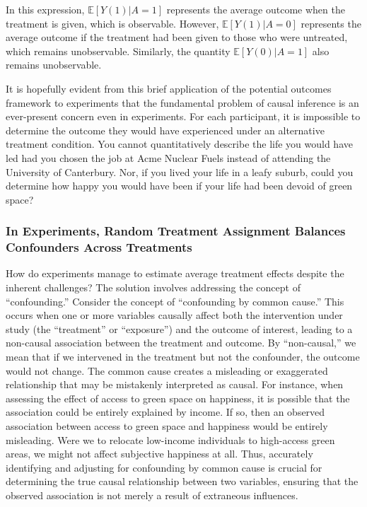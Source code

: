 \documentclass[
  singlecolumn]{article}
\begin{document}
In this expression, \(\mathbb{E}[Y(1)|A = 1]\) represents the average
outcome when the treatment is given, which is observable. However,
\(\mathbb{E}[Y(1)|A = 0]\) represents the average outcome if the
treatment had been given to those who were untreated, which remains
unobservable. Similarly, the quantity \(\mathbb{E}[Y(0)|A = 1]\) also
remains unobservable.

It is hopefully evident from this brief application of the potential
outcomes framework to experiments that the fundamental problem of causal
inference is an ever-present concern even in experiments. For each
participant, it is impossible to determine the outcome they would have
experienced under an alternative treatment condition. You cannot
quantitatively describe the life you would have led had you chosen the
job at Acme Nuclear Fuels instead of attending the University of
Canterbury. Nor, if you lived your life in a leafy suburb, could you
determine how happy you would have been if your life had been devoid of
green space?

\subsubsection{In Experiments, Random Treatment Assignment Balances
Confounders Across
Treatments}\label{in-experiments-random-treatment-assignment-balances-confounders-across-treatments}

How do experiments manage to estimate average treatment effects despite
the inherent challenges? The solution involves addressing the concept of
``confounding.'' Consider the concept of ``confounding by common
cause.'' This occurs when one or more variables causally affect both the
intervention under study (the ``treatment'' or ``exposure'') and the
outcome of interest, leading to a non-causal association between the
treatment and outcome. By ``non-causal,'' we mean that if we intervened
in the treatment but not the confounder, the outcome would not change.
The common cause creates a misleading or exaggerated relationship that
may be mistakenly interpreted as causal. For instance, when assessing
the effect of access to green space on happiness, it is possible that
the association could be entirely explained by income. If so, then an
observed association between access to green space and happiness would
be entirely misleading. Were we to relocate low-income individuals to
high-access green areas, we might not affect subjective happiness at
all. Thus, accurately identifying and adjusting for confounding by
common cause is crucial for determining the true causal relationship
between two variables, ensuring that the observed association is not
merely a result of extraneous influences.
\end{document}
